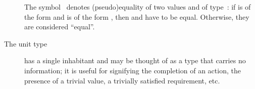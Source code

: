\begin{description}
The symbol~\AgdaDatatype{\~} denotes (pseudo)equality of two values  and
 of type~\AgdaSpace{}: if
 is of the form
\AgdaSpace{} and  is
of the form \AgdaSpace{}, then
 and  have to be equal. Otherwise, they are
considered ``equal''.
\item[The unit type]  has a single inhabitant  and may be thought
of as a type that carries no information; it is useful for signifying the completion of an action, the
presence of a trivial value, a trivially satisfied requirement, etc.
\end{description}
